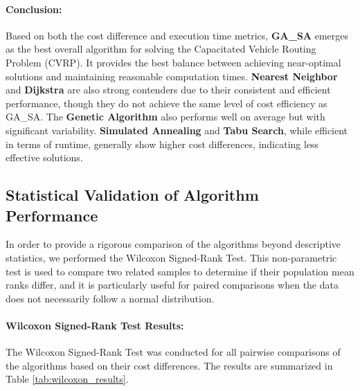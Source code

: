 \documentclass[
]{article}
\begin{document}
    \paragraph{Conclusion:}
    Based on both the cost difference and execution time metrics, \textbf{GA\_SA} emerges as the best overall algorithm for solving the Capacitated Vehicle Routing Problem (CVRP). It provides the best balance between achieving near-optimal solutions and maintaining reasonable computation times. \textbf{Nearest Neighbor} and \textbf{Dijkstra} are also strong contenders due to their consistent and efficient performance, though they do not achieve the same level of cost efficiency as GA\_SA. The \textbf{Genetic Algorithm} also performs well on average but with significant variability. \textbf{Simulated Annealing} and \textbf{Tabu Search}, while efficient in terms of runtime, generally show higher cost differences, indicating less effective solutions.

    \subsection{Statistical Validation of Algorithm Performance}

    In order to provide a rigorous comparison of the algorithms beyond descriptive statistics, we performed the Wilcoxon Signed-Rank Test. This non-parametric test is used to compare two related samples to determine if their population mean ranks differ, and it is particularly useful for paired comparisons when the data does not necessarily follow a normal distribution.

    \paragraph{Wilcoxon Signed-Rank Test Results:}
    The Wilcoxon Signed-Rank Test was conducted for all pairwise comparisons of the algorithms based on their cost differences. The results are summarized in Table \ref{tab:wilcoxon_results}.
\end{document}
